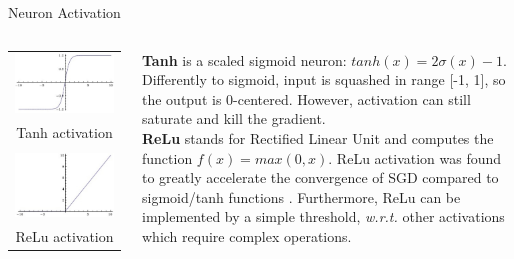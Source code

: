\documentclass[aspectratio=169]{beamer}
\begin{document}

\begin{frame}{Neuron Activation}
\begin{columns}
\begin{column}{0.25\textwidth}
\begin{tabular}{c}
\\
\includegraphics[width=\textwidth]{img/cnn/act_tanh.jpg}\\
Tanh activation\\
\\
\includegraphics[width=\textwidth]{img/cnn/act_relu.jpg}\\
ReLu activation
\end{tabular}
\end{column}
\begin{column}{0.7\textwidth}
\textbf{Tanh} is a scaled sigmoid neuron: $tanh(x)=2\sigma(x)-1$. Differently to sigmoid, input is squashed in range [-1, 1], so the output is 0-centered. However, activation can still saturate and kill the gradient.\\
\vspace{0.5cm}
\textbf{ReLu} stands for Rectified Linear Unit and computes the function $f(x) = max(0, x)$. ReLu activation was found to greatly accelerate the convergence of SGD compared to sigmoid/tanh functions \cite{krizhevsky2012imagenet}. Furthermore, ReLu can be implemented by a simple threshold, \emph{w.r.t.} other activations which require complex operations.
\end{column}
\end{columns}
\end{frame}
\end{document}
